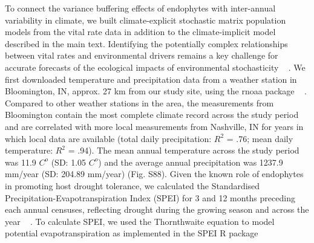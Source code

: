 \documentclass[lineno, sn-basic]{sn-jnl}%
\providecommand{\DIFadd}[1]{{\protect\color{blue}#1}} %
\providecommand{\DIFadd}[1]{{\protect\color{blue}\uwave{#1}}} %
\begin{document}
\DIFadd{To connect the variance buffering effects of endophytes with inter-annual variability in climate, we built climate-explicit stochastic matrix population models from the vital rate data in addition to the climate-implicit model described in the main text. 
Identifying the potentially complex relationships between vital rates and environmental drivers remains a key challenge for accurate forecasts of the ecological impacts of environmental stochasticity \mbox{%
\citep{ehrlen2015predicting}}\hspace{0pt}%
.
We first downloaded temperature and precipitation data from a weather station in Bloomington, IN,  approx. 27 km from our study site, using the rnoaa package \mbox{%
\citep{chamberlain2022package}}\hspace{0pt}%
. 
Compared to other weather stations in the area, the measurements from Bloomington contain the most complete climate record across the study period and are correlated with more local measurements from Nashville, IN for years in which local data are available (total daily precipitation: $R^2$ = .76; mean daily temperature: $R^2$ = .94).
The mean annual temperature across the study period was 11.9 $C^o $ (SD: 1.05 $C^o $) and the average annual precipitation was 1237.9 mm/year (SD: 204.89 mm/year) (Fig. S88).
Given the known role of endophytes in promoting host drought tolerance, we calculated the Standardised Precipitation-Evapotranspiration Index (SPEI) for 3 and 12 months preceding each annual censuses, reflecting drought during the growing season and across the year \mbox{%
\citep{vicente2010multiscalar}}\hspace{0pt}%
.
To calculate SPEI, we used the Thornthwaite equation to model potential evapotranspiration as implemented in the SPEI R package \mbox{%
\citep{begueria2013spei}
}\hspace{0pt}%
}
\end{document}
